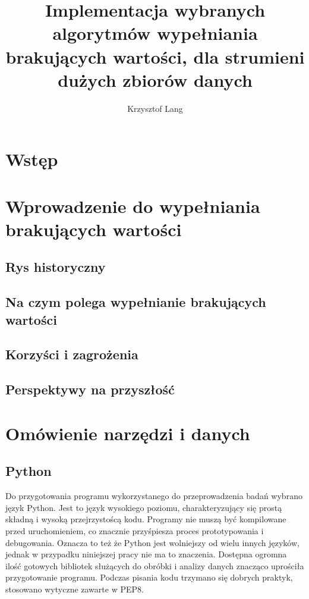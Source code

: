 \documentclass[12pt,twoside]{article}
\author{Krzysztof Lang}
\title{Implementacja wybranych algorytmów wypełniania brakujących wartości, dla strumieni dużych zbiorów danych}
\begin{document}
\maketitle

\blankpage

\tableofcontents
\clearpage
\blankpage


\section{Wstęp}
\clearpage


\section{Wprowadzenie do wypełniania brakujących wartości}

\subsection{Rys historyczny}
\subsection{Na czym polega wypełnianie brakujących wartości}
\subsection{Korzyści i zagrożenia}
\subsection{Perspektywy na przyszłość}
\clearpage


\section{Omówienie narzędzi i danych}

\subsection{Python}
Do przygotowania programu wykorzystanego do przeprowadzenia badań wybrano język Python.
Jest to język wysokiego poziomu, charakteryzujący się prostą składną i wysoką przejrzystoścą kodu.
Programy nie muszą być kompilowane przed uruchomieniem, co znacznie przyśpiesza proces prototypowania i debugowania.
Oznacza to też że Python jest wolniejszy od wielu innych języków, jednak w przypadku niniejszej pracy nie ma to znaczenia.
Dostępna ogromna ilość gotowych bibliotek służących do obróbki i analizy danych znacząco uprościła przygotowanie programu.
Podczas pisania kodu trzymano się dobrych praktyk, stosowano wytyczne zawarte w PEP8.
\end{document}
